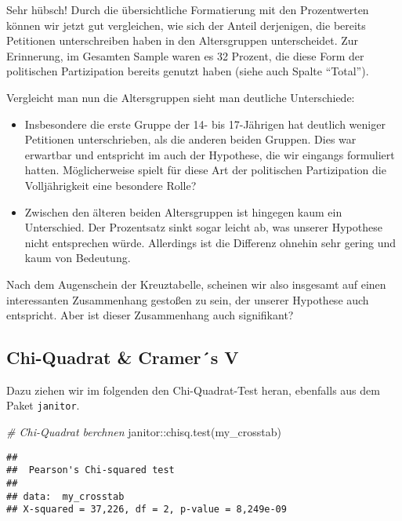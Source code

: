 \documentclass[
]{book}
\newenvironment{Shaded}{\begin{snugshade}}{\end{snugshade}}
\newcommand{\CommentTok}[1]{\textcolor[rgb]{0.56,0.35,0.01}{\textit{#1}}}
\newcommand{\FunctionTok}[1]{\textcolor[rgb]{0.00,0.00,0.00}{#1}}
\newcommand{\NormalTok}[1]{#1}
\newcommand{\SpecialCharTok}[1]{\textcolor[rgb]{0.00,0.00,0.00}{#1}}
\begin{document}
Sehr hübsch! Durch die übersichtliche Formatierung mit den Prozentwerten können wir jetzt gut vergleichen, wie sich der Anteil derjenigen, die bereits Petitionen unterschreiben haben in den Altersgruppen unterscheidet. Zur Erinnerung, im Gesamten Sample waren es 32 Prozent, die diese Form der politischen Partizipation bereits genutzt haben (siehe auch Spalte ``Total'').

Vergleicht man nun die Altersgruppen sieht man deutliche Unterschiede:

\begin{itemize}
\item
  Insbesondere die erste Gruppe der 14- bis 17-Jährigen hat deutlich weniger Petitionen unterschrieben, als die anderen beiden Gruppen. Dies war erwartbar und entspricht im auch der Hypothese, die wir eingangs formuliert hatten. Möglicherweise spielt für diese Art der politischen Partizipation die Volljährigkeit eine besondere Rolle?
\item
  Zwischen den älteren beiden Altersgruppen ist hingegen kaum ein Unterschied. Der Prozentsatz sinkt sogar leicht ab, was unserer Hypothese nicht entsprechen würde. Allerdings ist die Differenz ohnehin sehr gering und kaum von Bedeutung.
\end{itemize}

Nach dem Augenschein der Kreuztabelle, scheinen wir also insgesamt auf einen interessanten Zusammenhang gestoßen zu sein, der unserer Hypothese auch entspricht. Aber ist dieser Zusammenhang auch signifikant?

\hypertarget{chi-quadrat-cramers-v}{%
\subsection{Chi-Quadrat \& Cramer´s V}\label{chi-quadrat-cramers-v}}

Dazu ziehen wir im folgenden den Chi-Quadrat-Test heran, ebenfalls aus dem Paket \texttt{janitor}.

\begin{Shaded}
\begin{Highlighting}[]
\CommentTok{\# Chi{-}Quadrat berchnen}
\NormalTok{janitor}\SpecialCharTok{::}\FunctionTok{chisq.test}\NormalTok{(my\_crosstab)}
\end{Highlighting}
\end{Shaded}

\begin{verbatim}
## 
##  Pearson's Chi-squared test
## 
## data:  my_crosstab
## X-squared = 37,226, df = 2, p-value = 8,249e-09
\end{verbatim}
\end{document}
